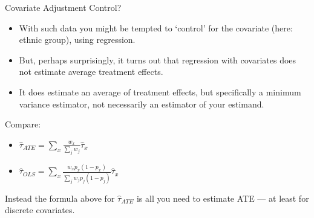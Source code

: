 \documentclass[
  11pt,
  ignorenonframetext,
]{beamer}
\providecommand{\tightlist}{%
  \setlength{\itemsep}{0pt}\setlength{\parskip}{0pt}}\usepackage{longtable,booktabs,array}
\begin{document}
\begin{frame}{Covariate Adjustment}
\protect\hypertarget{covariate-adjustment-3}{}
Control?

\begin{itemize}
\tightlist
\item
  With such data you might be tempted to `control' for the covariate
  (here: ethnic group), using regression.
\item
  But, perhaps surprisingly, it turns out that regression with
  covariates does not estimate average treatment effects.
\item
  It does estimate an average of treatment effects, but specifically a
  minimum variance estimator, not necessarily an estimator of your
  estimand.
\end{itemize}

Compare:

\begin{itemize}
\tightlist
\item
  \(\hat{\tau}_{ATE} =\sum_{x} \frac{w_x}{\sum_{j}w_{j}}\hat{\tau}_x\)
\item
  \(\hat{\tau}_{OLS} =\sum_{x} \frac{w_xp_x(1-p_x)}{\sum_{j}w_j{p_j(1-p_j)}}\hat{\tau}_x\)
\end{itemize}

Instead the formula above for \(\hat{\tau}_{ATE}\) is all you need to
estimate ATE --- at least for discrete covariates.
\end{frame}
\end{document}
